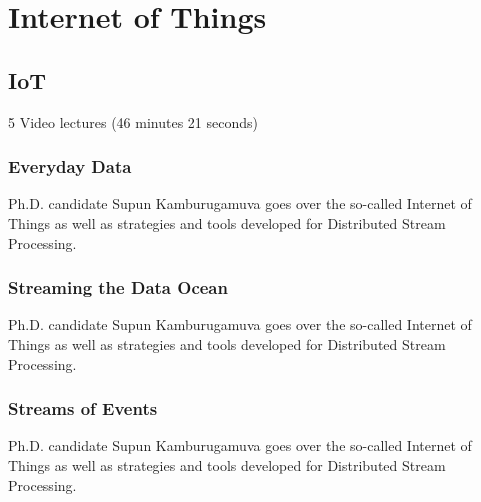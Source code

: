 \part{Internet of Things}
\label{sec:icloud-iot}

\chapter{IoT}

\FILENAME

  5 Video lectures (46 minutes 21 seconds)

\section{Everyday Data}

Ph.D. candidate Supun Kamburugamuva goes over the so-called Internet of
Things as well as strategies and tools developed for Distributed Stream
Processing.




\section{Streaming the Data Ocean}

Ph.D. candidate Supun Kamburugamuva goes over the so-called Internet of
Things as well as strategies and tools developed for Distributed Stream
Processing.



\section{Streams of Events}

Ph.D. candidate Supun Kamburugamuva goes over the so-called Internet of
Things as well as strategies and tools developed for Distributed Stream
Processing.

